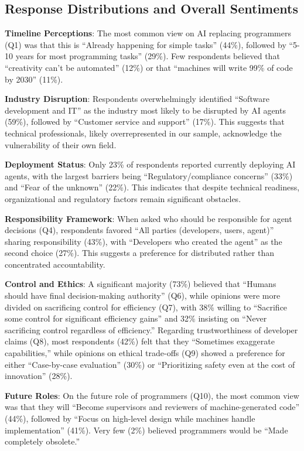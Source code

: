 \documentclass{article}
\begin{document}
\subsection{Response Distributions and Overall
	Sentiments}\label{response-distributions-and-overall-sentiments}

\textbf{Timeline Perceptions}: The most common view on AI replacing
programmers (Q1) was that this is ``Already happening for simple tasks''
(44\%), followed by ``5-10 years for most programming tasks'' (29\%).
Few respondents believed that ``creativity can't be automated'' (12\%)
or that ``machines will write 99\% of code by 2030'' (11\%).

\textbf{Industry Disruption}: Respondents overwhelmingly identified
``Software development and IT'' as the industry most likely to be
disrupted by AI agents (59\%), followed by ``Customer service and
support'' (17\%). This suggests that technical professionals, likely
overrepresented in our sample, acknowledge the vulnerability of their
own field.

\textbf{Deployment Status}: Only 23\% of respondents reported currently
deploying AI agents, with the largest barriers being
``Regulatory/compliance concerns'' (33\%) and ``Fear of the unknown''
(22\%). This indicates that despite technical readiness, organizational
and regulatory factors remain significant obstacles.

\textbf{Responsibility Framework}: When asked who should be responsible
for agent decisions (Q4), respondents favored ``All parties (developers,
users, agent)'' sharing responsibility (43\%), with ``Developers who
created the agent'' as the second choice (27\%). This suggests a
preference for distributed rather than concentrated accountability.

\textbf{Control and Ethics}: A significant majority (73\%) believed that
``Humans should have final decision-making authority'' (Q6), while
opinions were more divided on sacrificing control for efficiency (Q7),
with 38\% willing to ``Sacrifice some control for significant efficiency
gains'' and 32\% insisting on ``Never sacrificing control regardless of
efficiency.'' Regarding trustworthiness of developer claims (Q8), most
respondents (42\%) felt that they ``Sometimes exaggerate capabilities,''
while opinions on ethical trade-offs (Q9) showed a preference for either
``Case-by-case evaluation'' (30\%) or ``Prioritizing safety even at the
cost of innovation'' (28\%).

\textbf{Future Roles}: On the future role of programmers (Q10), the most
common view was that they will ``Become supervisors and reviewers of
machine-generated code'' (44\%), followed by ``Focus on high-level
design while machines handle implementation'' (41\%). Very few (2\%)
believed programmers would be ``Made completely obsolete.''
\end{document}
